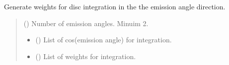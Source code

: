 \documentclass[letterpaper,10pt,english]{sphinxmanual}
\begin{document}

\begin{fulllineitems}
\label{\detokenize{api:nemesispy.disc_weights}}
\pysigstartsignatures
{}
\pysigstopsignatures
\sphinxAtStartPar
Generate weights for disc integration in the the emission angle
direction.
\begin{quote}\begin{description}
\sphinxAtStartPar
{} () \textendash{} Number of emission angles. Minuim 2.

\sphinxAtStartPar
\begin{itemize}
\item {} 
\sphinxAtStartPar
{} () \textendash{} List of cos(emission angle) for integration.

\item {} 
\sphinxAtStartPar
{} () \textendash{} List of weights for integration.

\end{itemize}


\end{description}\end{quote}

\end{fulllineitems}

\end{document}
